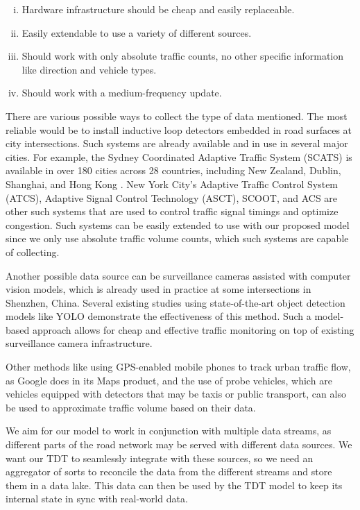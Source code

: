 \begin{enumerate}[(i)]
    \item Hardware infrastructure should be cheap and easily replaceable.
    \item Easily extendable to use a variety of different sources.
    \item Should work with only absolute traffic counts, no other specific information like direction and vehicle types.
    \item Should work with a medium-frequency update.
\end{enumerate}

There are various possible ways to collect the type of data mentioned. The most reliable would be to install inductive loop detectors embedded in road surfaces at city intersections. Such systems are already available and in use in several major cities. For example, the Sydney Coordinated Adaptive Traffic System (SCATS)\cite{scats} is available in over 180 cities across 28 countries, including New Zealand, Dublin, Shanghai, and Hong Kong \cite{wiki:sydney_traffic_system}. New York City's Adaptive Traffic Control System (ATCS), Adaptive Signal Control Technology (ASCT), SCOOT, and ACS are other such systems that are used to control traffic signal timings and optimize congestion. Such systems can be easily extended to use with our proposed model since we only use absolute traffic volume counts, which such systems are capable of collecting.

Another possible data source can be surveillance cameras assisted with computer vision models\cite{jain2019review}, which is already used in practice at some intersections in Shenzhen, China. Several existing studies\cite{asha2018vehicle} using state-of-the-art object detection models like YOLO\cite{redmon2018yolov3} demonstrate the effectiveness of this method. Such a model-based approach allows for cheap and effective traffic monitoring on top of existing surveillance camera infrastructure. 

Other methods like using GPS-enabled mobile phones\cite{rose2006mobile} to track urban traffic flow, as Google does in its Maps product, and the use of probe vehicles\cite{zhu2012probe}, which are vehicles equipped with detectors that may be taxis or public transport, can also be used to approximate traffic volume based on their data.

We aim for our model to work in conjunction with multiple data streams, as different parts of the road network may be served with different data sources. We want our TDT to seamlessly integrate with these sources, so we need an aggregator of sorts to reconcile the data from the different streams and store them in a data lake. This data can then be used by the TDT model to keep its internal state in sync with real-world data.


